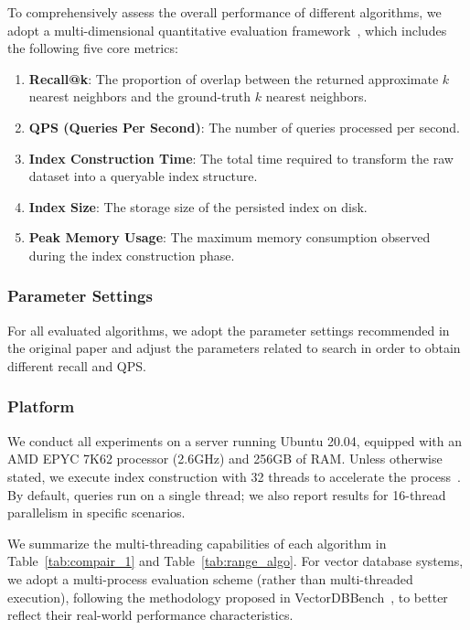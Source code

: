 \documentclass[sigconf, nonacm]{acmart}
\begin{document}
\begin{sloppypar}
To comprehensively assess the overall performance of different algorithms, we adopt a multi-dimensional quantitative evaluation framework~\cite{compare}, which includes the following five core metrics:

\begin{enumerate}

    \item \textbf{Recall@k}: The proportion of overlap between the returned approximate $k$ nearest neighbors and the ground-truth $k$ nearest neighbors.
    \item \textbf{QPS (Queries Per Second)}: The number of queries processed per second.
    \item \textbf{Index Construction Time}: The total time required to transform the raw dataset into a queryable index structure.
    \item \textbf{Index Size}: The storage size of the persisted index on disk.
    \item \textbf{Peak Memory Usage}: The maximum memory consumption observed during the index construction phase.
\end{enumerate}

\subsubsection{Parameter Settings}

For all evaluated algorithms, we adopt the parameter settings recommended in the original paper and adjust the parameters related to search in order to obtain different recall and QPS.



\subsubsection{Platform}


We conduct all experiments on a server running Ubuntu 20.04, equipped with an AMD EPYC 7K62 processor (2.6GHz) and 256GB of RAM. Unless otherwise stated, we execute index construction with 32 threads to accelerate the process~\cite{benchmarkindex}. By default, queries run on a single thread; we also report results for 16-thread parallelism in specific scenarios.

We summarize the multi-threading capabilities of each algorithm in Table~\ref{tab:compair_1} and Table~\ref{tab:range_algo}. For vector database systems, we adopt a multi-process evaluation scheme (rather than multi-threaded execution), following the methodology proposed in VectorDBBench~\cite{VectorDBBench}, to better reflect their real-world performance characteristics.




\end{sloppypar}
\end{document}
